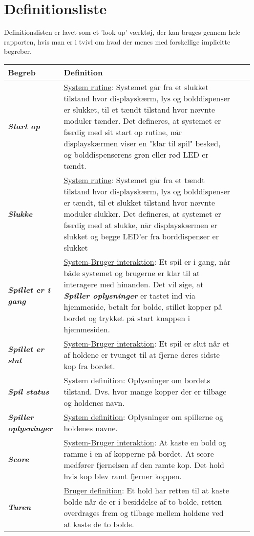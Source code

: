 \documentclass[Kravspecifikation/Kravspec_Main.tex]{subfiles}
\begin{document}
\section{Definitionsliste}
Definitionslisten er lavet som et 'look up' værktøj, der kan bruges gennem hele rapporten, hvis man er i tvivl om hvad der menes med forskellige implicitte begreber.
\begin{longtable}{|>{\centering\arraybackslash}m{3cm}|>{\RaggedRight\arraybackslash}m{10cm}| p{} | p{}|} 
\hline
        \large{Begreb} & \large{Definition}\\
        \hline
        \textit{\textbf{Start op}} & \underline{System rutine}:
        Systemet går fra et slukket tilstand hvor displayskærm, lys og bolddispenser er slukket, til et tændt tilstand hvor nævnte moduler tænder. Det defineres, at systemet er færdig med sit start op rutine, når displayskærmen viser en "klar til spil" besked, og bolddispenserens grøn eller rød LED er tændt.\\
        \hline
        \textit{\textbf{Slukke}} & \underline{System rutine}:
        Systemet går fra et tændt tilstand hvor displayskærm, lys og bolddispenser er tændt, til et slukket tilstand hvor nævnte moduler slukker. Det defineres, at systemet er færdig med at slukke, når displayskærmen er slukket og begge LED'er fra borddispenser er slukket\\
        \hline
        \textit{\textbf{Spillet er i gang}} & \underline{System-Bruger interaktion}:
        Et spil er i gang, når både systemet og brugerne er klar til at interagere med hinanden. Det vil sige, at \textit{\textbf{Spiller oplysninger}} er tastet ind via hjemmeside, betalt for bolde, stillet kopper på bordet og trykket på start knappen i hjemmesiden.\\
        \hline
        \textit{\textbf{Spillet er slut}} & \underline{System-Bruger interaktion}:
        Et spil er slut når et af holdene er tvunget til at fjerne deres sidste kop fra bordet.\\
        \hline
        \textit{\textbf{Spil status}} & \underline{System definition}:
        Oplysninger om bordets tilstand. Dvs. hvor mange kopper der er tilbage og holdenes navn. \\
        \hline
        \textit{\textbf{Spiller oplysninger}} & \underline{System definition}:
        Oplysninger om spillerne og holdenes navne. \\
        \hline
        \textit{\textbf{Score}} & \underline{System-Bruger interaktion}:
        At kaste en bold og ramme i en af kopperne på bordet. At score medfører fjernelsen af den ramte kop. Det hold hvis kop blev ramt fjerner koppen. \\
        \hline
        \textit{\textbf{Turen}} & \underline{Bruger definition}:
        Et hold har retten til at kaste bolde når de er i besiddelse af to bolde, retten overdrages frem og tilbage mellem holdene ved at kaste de to bolde. \\
        \hline
        

\end{longtable}
\end{document}
